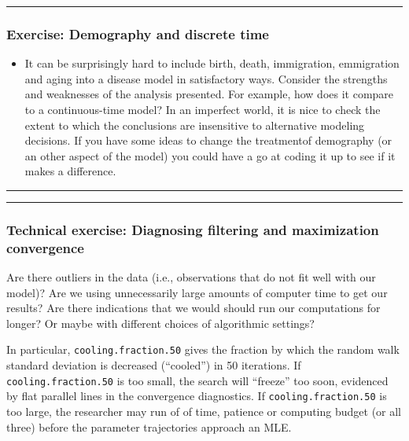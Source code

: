 \documentclass[]{article}
\providecommand{\tightlist}{%
  \setlength{\itemsep}{0pt}\setlength{\parskip}{0pt}}
\begin{document}
\begin{center}\rule{0.5\linewidth}{\linethickness}\end{center}

\subsubsection{Exercise: Demography and discrete
time}\label{exercise-demography-and-discrete-time}

\begin{itemize}
\tightlist
\item
  It can be surprisingly hard to include birth, death, immigration,
  emmigration and aging into a disease model in satisfactory ways.
  Consider the strengths and weaknesses of the analysis presented. For
  example, how does it compare to a continuous-time model? In an
  imperfect world, it is nice to check the extent to which the
  conclusions are insensitive to alternative modeling decisions. If you
  have some ideas to change the treatmentof demography (or an other
  aspect of the model) you could have a go at coding it up to see if it
  makes a difference.
\end{itemize}

\begin{center}\rule{0.5\linewidth}{\linethickness}\end{center}

\begin{center}\rule{0.5\linewidth}{\linethickness}\end{center}

\subsubsection{Technical exercise: Diagnosing filtering and maximization
convergence}\label{technical-exercise-diagnosing-filtering-and-maximization-convergence}

Are there outliers in the data (i.e., observations that do not fit well
with our model)? Are we using unnecessarily large amounts of computer
time to get our results? Are there indications that we would should run
our computations for longer? Or maybe with different choices of
algorithmic settings?

In particular, \texttt{cooling.fraction.50} gives the fraction by which
the random walk standard deviation is decreased (``cooled'') in 50
iterations. If \texttt{cooling.fraction.50} is too small, the search
will ``freeze'' too soon, evidenced by flat parallel lines in the
convergence diagnostics. If \texttt{cooling.fraction.50} is too large,
the researcher may run of of time, patience or computing budget (or all
three) before the parameter trajectories approach an MLE.
\end{document}
